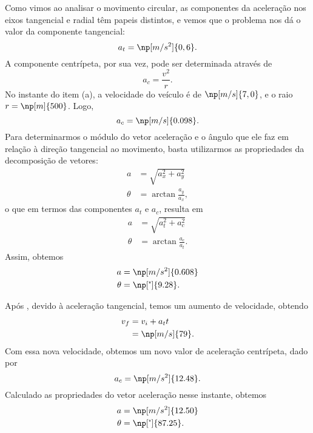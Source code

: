 Como vimos ao analisar o movimento circular, as componentes da aceleração nos eixos tangencial e radial têm papeis distintos, e vemos que o problema nos dá o valor da componente tangencial:
\begin{equation}
	a_t = \np[m/s^2]{0,6}.
\end{equation}
%
A componente centrípeta, por sua vez, pode ser determinada através de
\begin{equation}
	a_c = \frac{v^2}{r}.
\end{equation}
%
No instante do item (a), a velocidade do veículo é de $\np[m/s]{7,0}$, e o raio $r = \np[m]{500}$. Logo,
\begin{equation}
	a_c = \np[m/s]{0.098}.
\end{equation}
%
Para determinarmos o módulo do vetor aceleração e o ângulo que ele faz em relação à direção tangencial ao movimento, basta utilizarmos as propriedades da decomposição de vetores:
\begin{align}
	a &= \sqrt{a_x^2 + a_y^2} \\
	\theta &= \arctan\frac{a_y}{a_x},
\end{align}
%
o que em termos das componentes $a_t$ e $a_c$, resulta em 
\begin{align}
	a &= \sqrt{a_t^2 + a_c^2} \\
	\theta &= \arctan\frac{a_c}{a_t}.
\end{align}
%
Assim, obtemos
\begin{align}
	a &= \np[m/s^2]{0.608} \\
	\theta &= \np[\tcdegree]{9.28}.
\end{align}

Após , devido à aceleração tangencial, temos um aumento de velocidade, obtendo
\begin{align}
	v_f &= v_i + a_t t \\
	&= \np[m/s]{79}.
\end{align}
%
Com essa nova velocidade, obtemos um novo valor de aceleração centrípeta, dado por
\begin{equation}
	a_c = \np[m/s^2]{12.48}.
\end{equation}
%
Calculado as propriedades do vetor aceleração nesse instante, obtemos
\begin{align}
	a &= \np[m/s^2]{12.50} \\
	\theta &= \np[\tcdegree]{87.25}.
\end{align}

